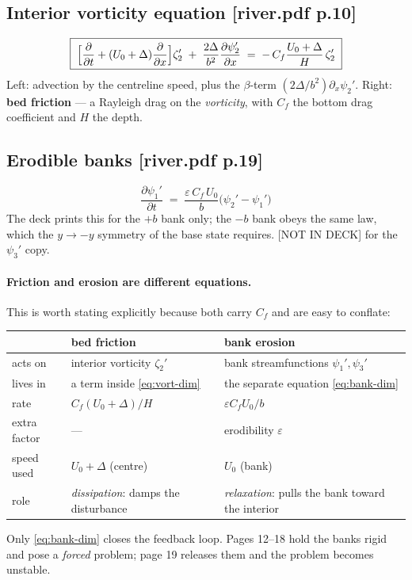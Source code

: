 \documentclass[11pt]{article}
\newcommand{\deck}[1]{{\color{blue!45!black}\small[river.pdf p.#1]}}
\newcommand{\notdeck}{{\color{red!55!black}\small[NOT IN DECK]}}
\newcommand{\zt}{\zeta_2'}
\newcommand{\pt}{\psi_2'}
\newcommand{\po}{\psi_1'}
\newcommand{\ph}{\psi_3'}
\newcommand{\dx}{\partial_x}
\begin{document}
\subsection{Interior vorticity equation \deck{10}}
\begin{equation}
  \boxed{\;\Bigl[\frac{\partial}{\partial t}+(U_0+\Delta)\frac{\partial}{\partial x}\Bigr]\zt
  \;+\;\frac{2\Delta}{b^{2}}\frac{\partial\pt}{\partial x}
  \;=\; -\,C_f\frac{U_0+\Delta}{H}\,\zt\;}
  \label{eq:vort-dim}
\end{equation}
Left: advection by the centreline speed, plus the $\beta$-term
$(2\Delta/b^{2})\dx\pt$. Right: \textbf{bed friction} --- a Rayleigh drag on the
\emph{vorticity}, with $C_f$ the bottom drag coefficient and $H$ the depth.

\subsection{Erodible banks \deck{19}}
\begin{equation}
  \boxed{\;\frac{\partial\po}{\partial t}
  \;=\;\frac{\varepsilon\,C_f\,U_0}{b}\bigl(\pt-\po\bigr)\;}
  \label{eq:bank-dim}
\end{equation}
The deck prints this for the $+b$ bank only; the $-b$ bank obeys the same law, which the
$y\to-y$ symmetry of the base state requires. \notdeck{} for the $\ph$ copy.

\paragraph{Friction and erosion are different equations.} This is worth stating
explicitly because both carry $C_f$ and are easy to conflate:
\begin{center}\small
\begin{tabular}{lll}
\toprule
 & \textbf{bed friction} & \textbf{bank erosion}\\
\midrule
acts on   & interior vorticity $\zt$ & bank streamfunctions $\po,\ph$\\
lives in  & a term inside \eqref{eq:vort-dim} & the separate equation \eqref{eq:bank-dim}\\
rate      & $C_f(U_0+\Delta)/H$ & $\varepsilon C_f U_0/b$\\
extra factor & --- & erodibility $\varepsilon$\\
speed used & $U_0+\Delta$ (centre) & $U_0$ (bank)\\
role      & \emph{dissipation}: damps the disturbance & \emph{relaxation}: pulls the
bank toward the interior\\
\bottomrule
\end{tabular}
\end{center}
Only \eqref{eq:bank-dim} closes the feedback loop. Pages 12--18 hold the banks rigid and
pose a \emph{forced} problem; page 19 releases them and the problem becomes unstable.
\end{document}
